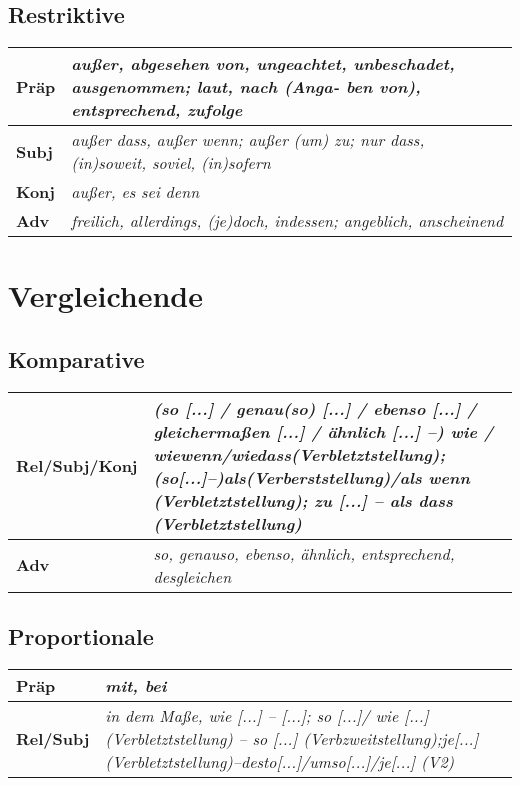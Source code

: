 \documentclass[UTF8]{report}
\begin{document}
\subsection{Restriktive}
\begin{longtable}{|>{\raggedright\arraybackslash}p{1cm}|>{\raggedright\arraybackslash}p{12cm}|}

\hline
\textbf{Präp} & \textit{außer, abgesehen von, ungeachtet, unbeschadet, ausgenommen; laut, nach (Anga- ben von), entsprechend, zufolge}\\
\hline
\textbf{Subj} & \textit{außer dass, außer wenn; außer (um) zu; nur dass, (in)soweit, soviel, (in)sofern} \\
\hline
\textbf{Konj} & \textit{außer, es sei denn} \\
\hline
\textbf{Adv} & \textit{freilich, allerdings, (je)doch, indessen; angeblich, anscheinend} \\
\hline
\end{longtable}

\section{Vergleichende}
\subsection{Komparative}


\begin{longtable}{|>{\raggedright\arraybackslash}p{3cm}|>{\raggedright\arraybackslash}p{12cm}|}

\hline
\textbf{Rel/Subj/Konj} & \textit{(so [...] / genau(so) [...] / ebenso [...] / gleichermaßen [...] / ähnlich [...] --) wie / wiewenn/wiedass(Verbletztstellung);(so[...]--)als(Verberststellung)/als wenn (Verbletztstellung); zu [...] -- als dass (Verbletztstellung)} \\
\hline
\textbf{Adv} & \textit{so, genauso, ebenso, ähnlich, entsprechend, desgleichen} \\
\hline

\end{longtable}

\subsection{Proportionale}
\begin{longtable}{|>{\raggedright\arraybackslash}p{2cm}|>{\raggedright\arraybackslash}p{12cm}|}

\hline
\textbf{Präp} & \textit{mit, bei}\\
\hline
\textbf{Rel/Subj} & \textit{in dem Maße, wie [...] -- [...]; so [...]/ wie [...] (Verbletztstellung) -- so [...] (Verbzweitstellung);je[...](Verbletztstellung)–desto[...]/umso[...]/je[...] (V2)} \\
\hline

\end{longtable}
\end{document}
